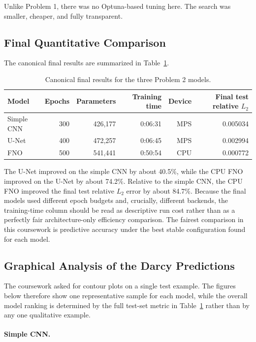 \documentclass[11pt]{article}
\begin{document}
Unlike Problem 1, there was no Optuna-based tuning here. The search was smaller, cheaper, and fully transparent.

\subsection*{Final Quantitative Comparison}

The canonical final results are summarized in Table~\ref{tab:p2final}.

\begin{table}[H]
\centering
\begin{tabular}{lrrrrr}
\toprule
Model & Epochs & Parameters & Training time & Device & Final test relative \(L_2\) \\
\midrule
Simple CNN & 300 & 426,177 & 0:06:31 & MPS & 0.005034 \\
U-Net & 400 & 472,257 & 0:06:45 & MPS & 0.002994 \\
FNO & 500 & 541,441 & 0:50:54 & CPU & 0.000772 \\
\bottomrule
\end{tabular}
\caption{Canonical final results for the three Problem 2 models.}
\label{tab:p2final}
\end{table}

The U-Net improved on the simple CNN by about 40.5\%, while the CPU FNO improved on the U-Net by about 74.2\%. Relative to the simple CNN, the CPU FNO improved the final test relative \(L_2\) error by about 84.7\%. Because the final models used different epoch budgets and, crucially, different backends, the training-time column should be read as descriptive run cost rather than as a perfectly fair architecture-only efficiency comparison. The fairest comparison in this coursework is predictive accuracy under the best stable configuration found for each model.

\subsection*{Graphical Analysis of the Darcy Predictions}

The coursework asked for contour plots on a single test example. The figures below therefore show one representative sample for each model, while the overall model ranking is determined by the full test-set metric in Table~\ref{tab:p2final} rather than by any one qualitative example.

\paragraph{Simple CNN.}
\end{document}
